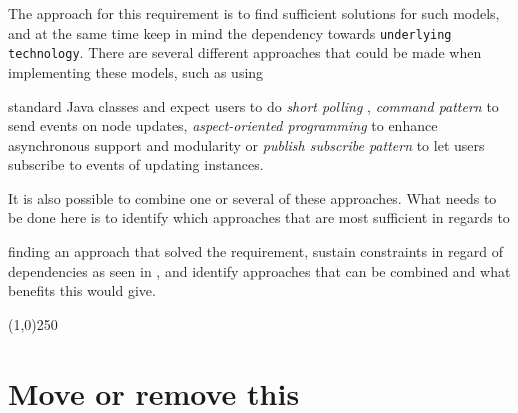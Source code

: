 The approach for this requirement is to find sufficient solutions for such models,
and at the same time keep in mind the dependency towards \texttt{underlying technology}.
There are several different approaches that could be made when implementing 
these models, such as using
\begin{ii}
  \iitem standard Java classes and expect users to do \emph{short polling} ,
  \iitem \emph{command pattern} to send events on node updates,
  \iitem \emph{aspect-oriented programming} to enhance asynchronous support and modularity or
  \iitem \emph{publish subscribe pattern} to let users subscribe to events of updating instances.
\end{ii}
It is also possible to combine one or several of these approaches.
What needs to be done here is to identify which approaches that are most sufficient 
in regards to 
\begin{ii} 
  \iitem finding an approach that solved the requirement,
  \iitem sustain constraints in regard of dependencies as seen in , and
  \iitem identify approaches that can be combined and what benefits this would give.
\end{ii} 

\begin{center}
\line(1,0){250}
\end{center}

\section{Move or remove this}


